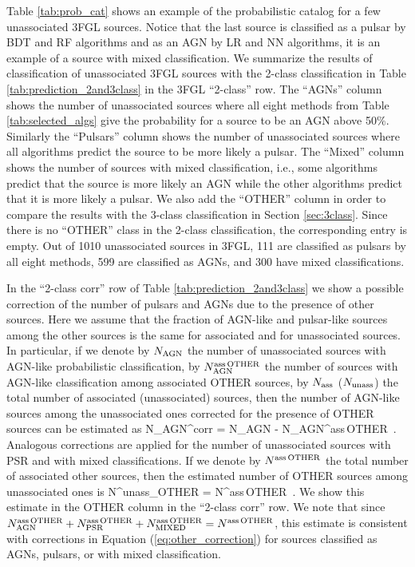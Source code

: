 Table \ref{tab:prob_cat} shows an example of the probabilistic catalog for a few unassociated 3FGL sources.
Notice that the last source is classified as a pulsar by BDT and RF algorithms and as an AGN by LR and NN algorithms,
it is an example of a source with mixed classification.
We summarize the results of classification of unassociated 3FGL sources with the 2-class classification 
in Table \ref{tab:prediction_2and3class} in the 3FGL ``2-class'' row.
The ``AGNs'' column shows the number of unassociated sources where all eight methods from Table \ref{tab:selected_algs} 
give the probability for a source to be an AGN above 50\%.
Similarly the ``Pulsars'' column shows the number of unassociated sources where all algorithms predict the source to be more likely a pulsar.
The ``Mixed'' column shows the number of sources with mixed classification, i.e., some algorithms predict that the source is more likely an AGN while the other algorithms predict that it is more likely a pulsar.
We also add the ``OTHER'' column in order to compare the results with the 3-class classification in Section \ref{sec:3class}.
Since there is no ``OTHER'' class in the 2-class classification, the corresponding entry is empty.
Out of 1010 unassociated sources in 3FGL, 111 are classified as pulsars by all eight methods, 599 are classified as AGNs, and 300 have mixed classifications.



In the ``2-class corr'' row of Table \ref{tab:prediction_2and3class}
we show a possible correction of the number of pulsars and AGNs due to the presence of other sources.
Here we assume that the fraction of AGN-like and pulsar-like sources among the other sources is the same for associated and for unassociated sources.
In particular, if we denote by $N_{\rm AGN}$ the number of unassociated sources with AGN-like probabilistic classification,
by $N_{\rm AGN}^{\rm ass\,OTHER}$ the number of sources with AGN-like classification among associated OTHER sources,
by $N_{\rm ass}$ ($N_{\rm unass}$) the total number of associated (unassociated) sources, then
the number of AGN-like sources among the unassociated ones corrected for the presence of OTHER sources can be estimated as
\bea
{}
N_{\rm AGN}^{\rm corr} = N_{\rm AGN} - N_{\rm AGN}^{\rm ass\,OTHER} \,.
\eea
Analogous corrections are applied for the number of unassociated sources with PSR and with mixed classifications.
If we denote by $N^{\rm ass\,OTHER}$ the total number of associated other sources, then the estimated number of 
OTHER sources among unassociated ones is
\bea
{}
N^{\rm unass}_{\rm OTHER} = N^{\rm ass\,OTHER} \,.
\eea
We show this estimate in the OTHER column in the ``2-class corr'' row.
We note that since 
$N_{\rm AGN}^{\rm ass\,OTHER} + N_{\rm PSR}^{\rm ass\,OTHER} + N_{\rm MIXED}^{\rm ass\,OTHER} = N^{\rm ass\,OTHER}$,
this estimate is consistent with corrections in Equation (\ref{eq:other_correction}) for sources classified as AGNs, pulsars, or with mixed classification.







